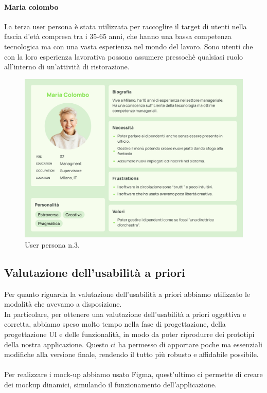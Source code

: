 \paragraph{Maria colombo}
La terza user persona è stata utilizzata per raccoglire il target di utenti nella fascia d'età compresa tra i 35-65 anni, che hanno una bassa competenza tecnologica ma con una vasta esperienza nel mondo del lavoro. Sono utenti che con la loro esperienza lavorativa possono assumere pressochè qualsiasi ruolo all'interno di un'attività di ristorazione.

\begin{figure}[H]
  \centering
  \includegraphics[scale=0.25]{img/personas/Maria_colombo_persona.png}
  \caption{User persona n.3.}
\end{figure}\newpage 
\subsection{Valutazione dell'usabilità a priori} 

Per quanto riguarda la valutazione dell'usabilità a priori abbiamo utilizzato le modalità che avevamo a disposizione. \\
In particolare, per ottenere una valutazione dell'usabilità a priori oggettiva e corretta, abbiamo speso molto tempo nella fase di progettazione,  della progettazione UI
e delle funzionalità, in modo da poter riprodurre dei prototipi della nostra applicazione. Questo ci ha permesso di apportare poche ma essenziali modifiche alla versione finale, rendendo il tutto più robusto e affidabile possibile.
\\
\\
Per realizzare i mock-up abbiamo usato Figma, quest'ultimo ci permette di
creare dei mockup dinamici, simulando il funzionamento dell'applicazione.
